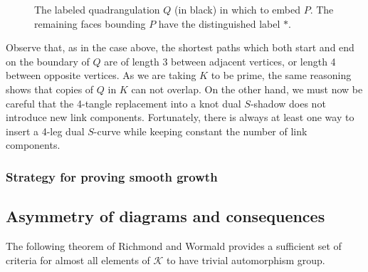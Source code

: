 \documentclass[amsmath,longbibliography,secnumarabic,floatfix,amssymb,nofootinbib,nobibnotes,letterpaper,11pt,tightenlines,notitlepage,showkeys,showlabels]{amsart}%
\newcommand{\FlatKnotDia}{\mathscr{K}}
\theoremstyle{definition}
\begin{document}
\begin{enumerate}
\begin{enumerate}[i.]
\begin{figure}[h!]
      \caption{The labeled quadrangulation $Q$ (in black) in which to
        embed $P$. The remaining
        faces bounding $P$ have the distinguished label $*$.}
      \label{fig:knottangrep}
    \end{figure}
    Observe that, as in the case above, the shortest paths which both
    start and end on the boundary of $Q$ are of length 3 between
    adjacent vertices, or length 4 between opposite vertices. As we
    are taking $K$ to be prime, the same reasoning shows that copies
    of $Q$ in $K$ can not overlap. On the other hand, we must now be
    careful that the 4-tangle replacement into a knot dual $S$-shadow
    does not introduce new link components. Fortunately, there is
    always at least one way to insert a 4-leg dual $S$-curve while
    keeping constant the number of link components.
  \end{enumerate}
\end{enumerate}

\subsubsection{Strategy for proving smooth growth}
\label{sec:smoothstratproof}


\subsection{Asymmetry of diagrams and consequences}
\label{sec:asymmetry}


The following theorem of Richmond and Wormald \cite{Richmond19951} provides a sufficient set of
criteria for almost all elements of $\FlatKnotDia$ to have trivial automorphism group.
\end{document}
